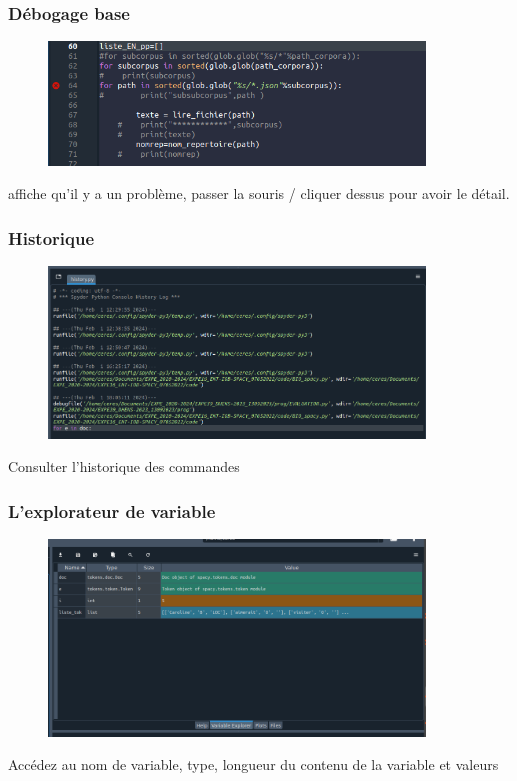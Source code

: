 \begin{frame}
  \frametitle{Débogage base}
  \begin{figure}
  \includegraphics[width=10cm]{images/spyder_signal_erreur.png}
	\end{figure} 
	 affiche qu'il y a un problème, passer la souris / cliquer dessus pour avoir le détail. 
  \end{frame}
  
\begin{frame}
  \frametitle{Historique}
  \begin{figure}
  \includegraphics[width=10cm]{images/spyder_hystory}
	\end{figure} 
	 Consulter l'historique des commandes  
  \end{frame}

\begin{frame}  
\frametitle{L'explorateur de variable}
\begin{figure}
  \includegraphics[width=10cm]{images/spyder_explo_variable.png}
  \end{figure}
   Accédez au nom de variable, type, longueur du contenu de la variable et valeurs
\end{frame}

